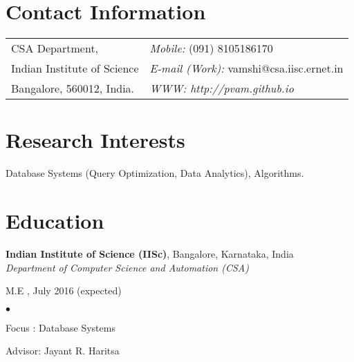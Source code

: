 \documentclass[margin,line]{res}
\newenvironment{list1}{
  \begin{list}{\ding{113}}{%
      \setlength{\itemsep}{0in}
      \setlength{\parsep}{0in} \setlength{\parskip}{0in}
      \setlength{\topsep}{0in} \setlength{\partopsep}{0in} 
      \setlength{\leftmargin}{0.17in}}}{\end{list}}
\newenvironment{list2}{
  \begin{list}{$\bullet$}{%
      \setlength{\itemsep}{0in}
      \setlength{\parsep}{0in} \setlength{\parskip}{0in}
      \setlength{\topsep}{0in} \setlength{\partopsep}{0in} 
      \setlength{\leftmargin}{0.2in}}}{\end{list}}
\begin{document}

\begin{resume}
\section{\sc Contact Information}
\vspace{.05in}
\begin{tabular}{@{}p{3in}p{4in}}
CSA Department,             & {\it Mobile:}  (091) 8105186170 \\            
Indian Institute of Science & {\it E-mail (Work):}  vamshi@csa.iisc.ernet.in\\       
Bangalore, 560012, India.  & {\it WWW: http://pvam.github.io} \\     
\end{tabular}


\section{\sc Research Interests}

Database Systems (Query Optimization, Data Analytics), Algorithms.

\section{\sc Education}
{\bf Indian Institute of Science (IISc)}, Bangalore, Karnataka, India\\
{\em Department of Computer Science and Automation (CSA)} 
\begin{list1}
\item[]  M.E , July 2016 (expected)
\begin{list2}
\vspace*{.05in}
%
\item Focus : Database Systems
\item Advisor:  Jayant R. Haritsa
\end{list2}
\end{list1}


\end{resume}
\end{document}
